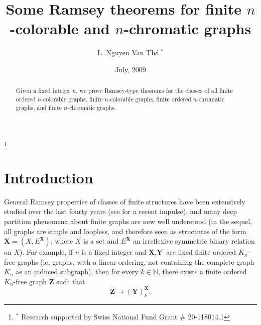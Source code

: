 \documentclass[reqno]{amsart}
\begin{document}
\author{L. Nguyen Van Th\'{e} $^*$}

\address{Institut de math\'ematiques, Universit\'e de Neuch\^atel, Rue Emile-Argand 11, 2000 Neuch\^atel, Switzerland}


\thanks{$^*$ Research supported by Swiss National Fund Grant \# 20-118014.1}

\title{Some Ramsey theorems for finite $n$-colorable and $n$-chromatic graphs}

\date{July, 2009}

\begin{abstract}
Given a fixed integer $n$, we prove Ramsey-type theorems for the classes of all finite ordered $n$-colorable graphs, finite $n$-colorable graphs, finite ordered $n$-chromatic graphs, and finite $n$-chromatic graphs.  

\end{abstract}

\maketitle

\section{Introduction}

General Ramsey properties of classes of finite structures have been extensively studied over the last fourty years (see \cite{KPT} for a recent impulse), and many deep partition phenomena about finite graphs are new well understood (in the sequel, all graphs are simple and loopless, and therefore seen as structures of the form ${\textbf{{X}}}=(X, E^{{\textbf{{X}}}})$, where $X$ is a set and $E^{{\textbf{{X}}}}$ an irreflexive symmetric binary relation on $X$). For example, if $n$ is a fixed integer and ${\textbf{{X}}}, {\textbf{{Y}}}$ are fixed finite ordered $K_n$-free graphs (ie, graphs, with a linear ordering, not containing the complete graph $K_n$ as an induced subgraph), then for every $k \in {\mathbb{N}}$, there exists a finite ordered $K_n$-free graph ${\textbf{{Z}}}$ such that \[ {\textbf{{Z}}} {\longrightarrow {{({\textbf{{Y}}})}}^{{{\textbf{{X}}}}}_{{k}}}. \] 
\end{document}
